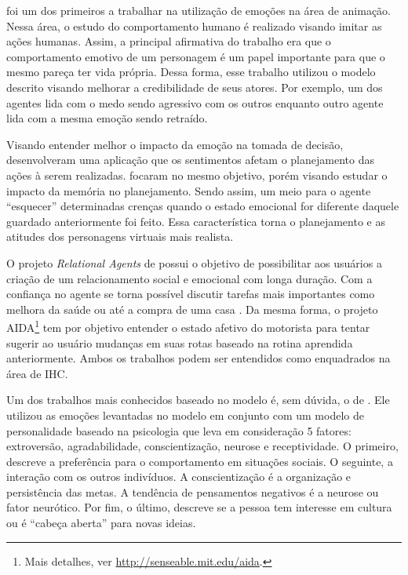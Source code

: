 \citet{bates1994role} foi um dos primeiros a trabalhar na utilização de emoções
na área de animação. Nessa área, o estudo do comportamento humano é realizado
visando imitar as ações humanas. Assim, a principal afirmativa do trabalho era
que o comportamento emotivo de um personagem é um papel importante para que o
mesmo pareça ter vida própria. Dessa forma, esse trabalho utilizou o modelo
descrito visando melhorar a credibilidade de seus atores. Por exemplo, um dos
agentes lida com o medo sendo agressivo com os outros enquanto outro agente
lida com a mesma emoção sendo retraído.

Visando entender melhor o impacto da emoção na tomada de decisão,
\citet{zhang2009emotional} desenvolveram uma aplicação que os sentimentos
afetam o planejamento das ações à serem realizadas.
\citet{neto2010construction} focaram no mesmo objetivo, porém visando estudar
o impacto da memória no planejamento. Sendo assim, um meio para o agente
``esquecer'' determinadas crenças quando o estado emocional for diferente
daquele guardado anteriormente foi feito. Essa característica torna o
planejamento e as atitudes dos personagens virtuais mais realista.

O projeto \emph{Relational Agents} de \citet{bick2003relational} possui o
objetivo de possibilitar aos usuários a criação de um relacionamento social e
emocional com longa duração. Com a confiança no agente se torna possível
discutir tarefas mais importantes como melhora da saúde ou até a compra de uma
casa \cite{bickmore2009virtual}. Da mesma forma, o projeto AIDA\footnote{Mais
detalhes, ver \url{http://senseable.mit.edu/aida}.} tem por objetivo entender
o estado afetivo do motorista para tentar sugerir ao usuário mudanças
em suas rotas baseado na rotina aprendida anteriormente. Ambos os trabalhos
podem ser entendidos como enquadrados na área de IHC.

Um dos trabalhos mais conhecidos baseado no modelo \occ é, sem dúvida, o de
\citet{kshirsagar2002multilayer}. Ele utilizou
as emoções levantadas no modelo em conjunto com um modelo de personalidade
baseado na psicologia que leva em consideração 5 fatores: extroversão,
agradabilidade, conscientização, neurose e receptividade. O primeiro, descreve
a preferência para o comportamento em situações sociais. O seguinte, a
interação com os outros indivíduos. A conscientização é a organização e
persistência das metas. A tendência de pensamentos negativos é a neurose ou
fator neurótico. Por fim, o último, descreve se a pessoa tem interesse em
cultura ou é ``cabeça aberta'' para novas ideias.


